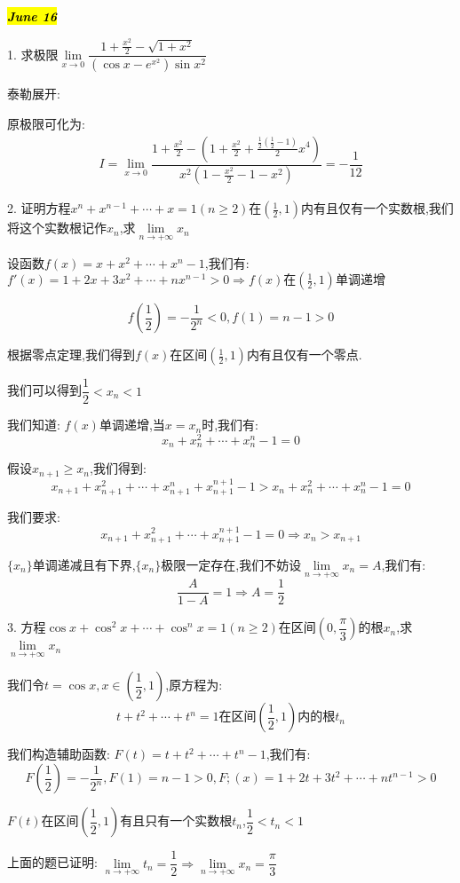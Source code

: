 
\hl{\textbf{\textit{June 16}}}

1. 求极限$\lim\limits_{x\rightarrow 0}\dfrac{1+\frac{x^2}{2}-\sqrt{1+x^2}}{(\cos x-e^{x^2})\sin x^2}$
\begin{solution}
	
	泰勒展开: 
	
	原极限可化为: 
	\begin{eqnarray*}
		I=\lim\limits_{x\rightarrow 0}\dfrac{1+\frac{x^2}{2}-(1+\frac{x^2}{2}+\frac{\frac{1}{2}(\frac{1}{2}-1)}{2}x^4)}{x^2(1-\frac{x^2}{2}-1-x^2)}=-\dfrac{1}{12}
	\end{eqnarray*}
\end{solution}


2. 证明方程$x^n+x^{n-1}+\cdots+x=1(n\geq 2)$在$(\frac{1}{2},1)$内有且仅有一个实数根,我们将这个实数根记作$x_{n}$,求$\lim\limits_{n\rightarrow+\infty}x_{n}$
\begin{solution}
	
	设函数$f(x)=x+x^2+\cdots+x^n-1$,我们有: $f'(x)=1+2x+3x^2+\cdots+nx^{n-1}>0\Rightarrow f(x)\text{在}(\frac{1}{2},1)\text{单调递增}$
	
	$$f(\frac{1}{2})=-\frac{1}{2^n}<0, f(1)=n-1>0$$
	
	根据零点定理,我们得到$f(x)$在区间$(\frac{1}{2},1)$内有且仅有一个零点.
	
	我们可以得到$\dfrac{1}{2}<x_{n}<1$
	
	我们知道: $f(x)$单调递增,当$x=x_{n}$时,我们有: 
	$$x_{n}+x_{n}^2+\cdots+x_{n}^n-1=0$$
	
	假设$x_{n+1}\geq x_{n}$,我们得到: 
	$$x_{n+1}+x_{n+1}^2+\cdots+x_{n+1}^n+x_{n+1}^{n+1}-1>x_{n}+x_{n}^2+\cdots+x_{n}^n-1=0$$
	
	我们要求: 
	$$x_{n+1}+x_{n+1}^2+\cdots+x_{n+1}^{n+1}-1=0\Rightarrow x_{n}>x_{n+1}$$
	
	$\{x_{n}\}$单调递减且有下界,$\{x_{n}\}$极限一定存在,我们不妨设$\lim\limits_{n\rightarrow +\infty}x_{n}=A$,我们有: 
	$$\dfrac{A}{1-A}=1\Rightarrow A=\dfrac{1}{2}$$
	
\end{solution}


3. 方程$\cos x+\cos^2 x+\cdots+\cos^n x=1(n\geq 2)$在区间$(0,\dfrac{\pi}{3})$的根$x_{n}$,求$\lim\limits_{n\rightarrow+\infty}x_{n}$
\begin{solution}
	
	我们令$t=\cos x,x\in(\dfrac{1}{2},1)$,原方程为: 
	$$t+t^2+\cdots+t^{n}=1\text{在区间}(\dfrac{1}{2},1)\text{内的根}t_{n}$$
	
	我们构造辅助函数: $F(t)=t+t^2+\cdots+t^{n}-1$,我们有: 
	$$F(\dfrac{1}{2})=-\dfrac{1}{2^n},F(1)=n-1>0,F;(x)=1+2t+3t^2+\cdots+nt^{n-1}>0$$
	
	$F(t)$在区间$(\dfrac{1}{2},1)$有且只有一个实数根$t_{n}$,$\dfrac{1}{2}<t_{n}<1$
	
	上面的题已证明: $\lim\limits_{n\rightarrow+\infty}t_{n}=\dfrac{1}{2}\Rightarrow\lim\limits_{n\rightarrow+\infty}x_{n}=\dfrac{\pi}{3}$
\end{solution}

